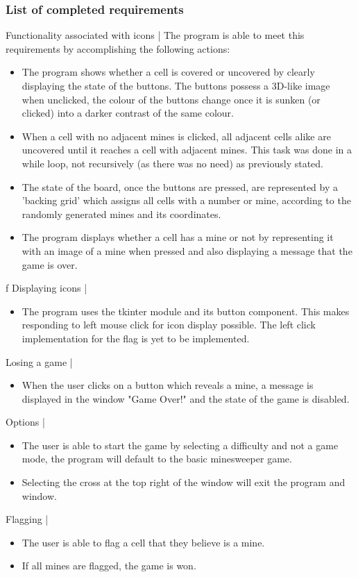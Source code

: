 \documentclass[12pt, a4]{report}
\begin{document}
		\subsubsection{List of completed requirements}
		Functionality associated with icons |
		The program is able to meet this requirements by accomplishing the following actions:
		\begin{itemize}
			\item The program shows whether a cell is covered or uncovered by clearly displaying the state of the buttons. The buttons possess a 3D-like image when unclicked, the colour of the buttons change once it is sunken (or clicked) into a darker contrast of the same colour. 
			\item When a cell with no adjacent mines is clicked, all adjacent cells alike are uncovered until it reaches a cell with adjacent mines. This task was done in a while loop, not recursively (as there was no need) as previously stated. 
			\item The state of the board, once the buttons are pressed, are represented by a 'backing grid' which assigns all cells with a number or mine, according to the randomly generated mines and its coordinates.
			\item The program displays whether a cell has a mine or not by representing it with an image of a mine when pressed and also displaying a message that the game is over.
		\end{itemize}
f		\newline
		Displaying icons |
		\begin{itemize}
		\par
		\item The program uses the tkinter module and its button component. This makes responding to left mouse click for icon display possible. The left click implementation for the flag is yet to be implemented. 
		\end{itemize}
		Losing a game |
		\begin{itemize}
		\par 
		\item When the user clicks on a button which reveals a mine, a message is displayed in the window "Game Over!" and the state of the game is disabled. 
		\end{itemize}
		Options |
		\begin{itemize}
		\par 
		\item The user is able to start the game by selecting a difficulty and not a game mode, the program will default to the basic minesweeper game. 
		\item Selecting the cross at the top right of the window will exit the program and window. 
		\end{itemize}
		Flagging | 
		\begin {itemize}
		\item The user is able to flag a cell that they believe is a mine.
		\item If all mines are flagged, the game is won.
		\end{itemize}
\end{document}
